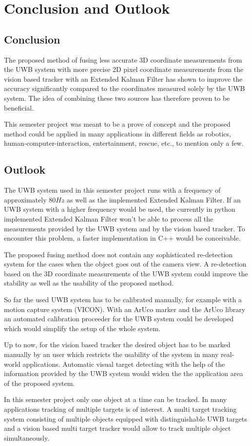 \chapter{Conclusion and Outlook}

\section{Conclusion}
The proposed method of fusing less accurate 3D coordinate measurements from the \ac{UWB} system with more precise 2D pixel coordinate measurements from the vision based tracker with an Extended Kalman Filter has shown to improve the accuracy significantly compared to the coordinates measured solely by the \ac{UWB} system. The idea of combining these two sources has therefore proven to be beneficial.

This semester project was meant to be a prove of concept and the proposed method could be applied in many applications in different fields as robotics, human-computer-interaction, entertainment, rescue, etc., to mention only a few.

\section{Outlook}\textsl{}
The \ac{UWB} system used in this semester project runs with a frequency of approximately $80\mathit{Hz}$ as well as the implemented Extended Kalman Filter. If an \ac{UWB} system with a higher frequency would be used, the currently in python implemented Extended Kalman Filter won't be able to process all the measurements provided by the \ac{UWB} system and by the vision based tracker. To encounter this problem, a faster implementation in C++ would be conceivable.

The proposed fusing method does not contain any sophisticated re-detection system for the cases when the object goes out of the camera view. A re-detection based on the 3D coordinate measurements of the \ac{UWB} system could improve the stability as well as the usability of the proposed method.

So far the used \ac{UWB} system has to be calibrated manually, for example with a motion capture system (VICON). With an ArUco marker and the ArUco library \cite{Aruco2014} an automated calibration proceeder for the \ac{UWB} system could be developed which would simplify the setup of the whole system. 

Up to now, for the vision based tracker the desired object has to be marked manually by an user which restricts the usability of the system in many real-world applications. Automatic visual target detecting with the help of the information provided by the \ac{UWB} system would widen the the application area of the proposed system.

In this semester project only one object at a time can be tracked. In many applications tracking of multiple targets is of interest. A multi target tracking system consisting of multiple objects equipped with distinguishable \ac{UWB} targets and a vision based multi target tracker would allow to track multiple object simultaneously. 